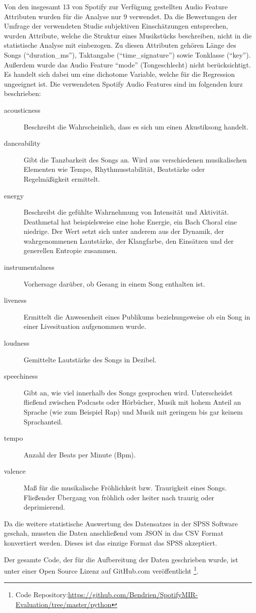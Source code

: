 Von den insgesamt 13 von Spotify zur Verfügung gestellten Audio Feature Attributen wurden für die Analyse nur 9 verwendet.
Da die Bewertungen der Umfrage der verwendeten Studie subjektiven Einschätzungen entsprechen, wurden Attribute, welche die Struktur eines Musikstücks beschreiben, nicht in die statistische Analyse mit einbezogen.
Zu diesen Attributen gehören Länge des Songs ("`duration\_ms"'), Taktangabe ("`time\_signature"') sowie  Tonklasse ("`key"').
Außerdem wurde das Audio Feature "`mode"' (Tongeschlecht) nicht berücksichtigt. Es handelt sich dabei um eine dichotome Variable, welche für die Regression ungeeignet ist.
Die verwendeten Spotify Audio Features sind im folgenden kurz beschrieben:

\begin{description}
    \item[acousticness]
        Beschreibt die Wahrscheinlich, dass  es sich um einen Akustiksong handelt.
    \item[danceability]
        Gibt die Tanzbarkeit des Songs an.
        Wird aus verschiedenen musikalischen Elementen wie Tempo, Rhythmusstabilität, Beatstärke oder Regelmäßigkeit ermittelt.
    \item[energy]
        Beschreibt die gefühlte Wahrnehmung von Intensität und Aktivität.
        Deathmetal hat beispielsweise eine hohe Energie, ein Bach Choral eine niedrige. Der Wert setzt sich unter anderem aus der Dynamik, der wahrgenommenen Lautstärke, der Klangfarbe, den Einsätzen und der generellen Entropie zusammen.
    \item[instrumentalness]
        Vorhersage darüber, ob Gesang in einem Song enthalten ist.
    \item[liveness]
        Ermittelt die Anwesenheit eines Publikums beziehungsweise ob ein Song in einer Livesituation aufgenommen wurde.
    \item[loudness]
        Gemittelte Lautstärke des Songs in Dezibel.
    \item[speechiness]
        Gibt an, wie viel innerhalb des Songs gesprochen wird.
        Unterscheidet fließend zwischen Podcasts oder Hörbücher, Musik mit hohem Anteil an Sprache (wie zum Beispiel Rap) und Musik mit geringem bis gar keinem Sprachanteil.
    \item[tempo]
        Anzahl der Beats per Minute (Bpm).
    \item[valence]
        Maß für die musikalische Fröhlichkeit bzw. Traurigkeit eines Songs.
        Fließender Übergang von fröhlich oder heiter nach traurig oder deprimierend.
\end{description}

Da die weitere statistische Auswertung des Datensatzes in der SPSS Software geschah, mussten die Daten anschließend vom JSON in das CSV Format konvertiert werden. Dieses ist das einzige Format das SPSS akzeptiert.

Der gesamte Code, der für die Aufbereitung der Daten geschrieben wurde, ist unter einer Open Source Lizenz auf GitHub.com veröffentlicht \footnote{Code Repository:\hfill \url{https://github.com/Bendrien/SpotifyMIR-Evaluation/tree/master/python}}.

